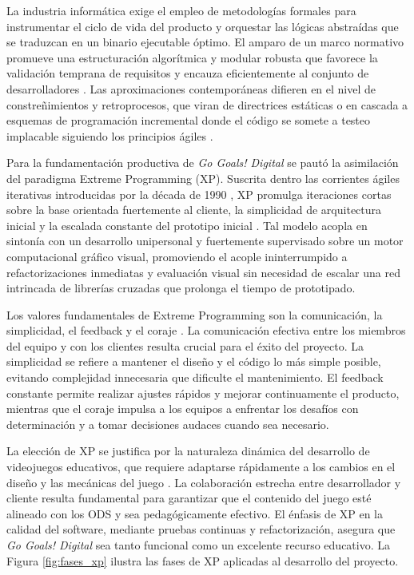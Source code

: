 La industria informática exige el empleo de metodologías formales para instrumentar el ciclo de vida del producto y orquestar las lógicas abstraídas que se traduzcan en un binario ejecutable óptimo. El amparo de un marco normativo promueve una estructuración algorítmica y modular robusta que favorece la validación temprana de requisitos y encauza eficientemente al conjunto de desarrolladores \parencite{Sommerville2021}. Las aproximaciones contemporáneas difieren en el nivel de constreñimientos y retroprocesos, que viran de directrices estáticas o en cascada a esquemas de programación incremental donde el código se somete a testeo implacable siguiendo los principios ágiles \parencite{SchwaberSutherland2020}.

Para la fundamentación productiva de \textit{Go Goals! Digital} se pautó la asimilación del paradigma Extreme Programming (XP). Suscrita dentro las corrientes ágiles iterativas introducidas por la década de 1990 \parencite{Beck2004}, XP promulga iteraciones cortas sobre la base orientada fuertemente al cliente, la simplicidad de arquitectura inicial y la escalada constante del prototipo inicial \parencite{Cockburn2006}. Tal modelo acopla en sintonía con un desarrollo unipersonal y fuertemente supervisado sobre un motor computacional gráfico visual, promoviendo el acople ininterrumpido a refactorizaciones inmediatas y evaluación visual sin necesidad de escalar una red intrincada de librerías cruzadas que prolonga el tiempo de prototipado.

Los valores fundamentales de Extreme Programming son la comunicación, la simplicidad, el feedback y el coraje \parencite{Beck2004}. La comunicación efectiva entre los miembros del equipo y con los clientes resulta crucial para el éxito del proyecto. La simplicidad se refiere a mantener el diseño y el código lo más simple posible, evitando complejidad innecesaria que dificulte el mantenimiento. El feedback constante permite realizar ajustes rápidos y mejorar continuamente el producto, mientras que el coraje impulsa a los equipos a enfrentar los desafíos con determinación y a tomar decisiones audaces cuando sea necesario.

La elección de XP se justifica por la naturaleza dinámica del desarrollo de videojuegos educativos, que requiere adaptarse rápidamente a los cambios en el diseño y las mecánicas del juego \parencite{SchwaberSutherland2020}. La colaboración estrecha entre desarrollador y cliente resulta fundamental para garantizar que el contenido del juego esté alineado con los ODS y sea pedagógicamente efectivo. El énfasis de XP en la calidad del software, mediante pruebas continuas y refactorización, asegura que \textit{Go Goals! Digital} sea tanto funcional como un excelente recurso educativo. La Figura \ref{fig:fases_xp} ilustra las fases de XP aplicadas al desarrollo del proyecto.

